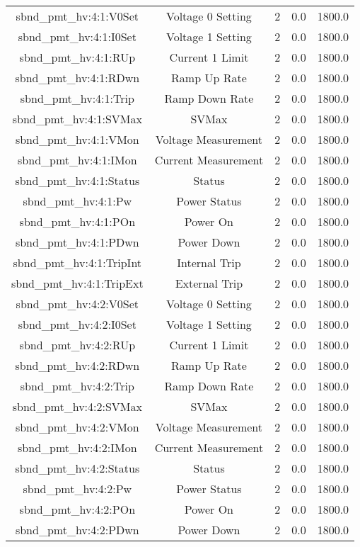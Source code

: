 \begin{center}
\begin{longtable}{c | c c c c }
sbnd\_pmt\_hv:4:1:V0Set & Voltage 0 Setting & 2 & 0.0 & 1800.0\\ 
sbnd\_pmt\_hv:4:1:I0Set & Voltage 1 Setting & 2 & 0.0 & 1800.0\\ 
sbnd\_pmt\_hv:4:1:RUp & Current 1 Limit & 2 & 0.0 & 1800.0\\ 
sbnd\_pmt\_hv:4:1:RDwn & Ramp Up Rate & 2 & 0.0 & 1800.0\\ 
sbnd\_pmt\_hv:4:1:Trip & Ramp Down Rate & 2 & 0.0 & 1800.0\\ 
sbnd\_pmt\_hv:4:1:SVMax & SVMax & 2 & 0.0 & 1800.0\\ 
sbnd\_pmt\_hv:4:1:VMon & Voltage Measurement & 2 & 0.0 & 1800.0\\ 
sbnd\_pmt\_hv:4:1:IMon & Current Measurement & 2 & 0.0 & 1800.0\\ 
sbnd\_pmt\_hv:4:1:Status & Status & 2 & 0.0 & 1800.0\\ 
sbnd\_pmt\_hv:4:1:Pw & Power Status & 2 & 0.0 & 1800.0\\ 
sbnd\_pmt\_hv:4:1:POn & Power On & 2 & 0.0 & 1800.0\\ 
sbnd\_pmt\_hv:4:1:PDwn & Power Down & 2 & 0.0 & 1800.0\\ 
sbnd\_pmt\_hv:4:1:TripInt & Internal Trip & 2 & 0.0 & 1800.0\\ 
sbnd\_pmt\_hv:4:1:TripExt & External Trip & 2 & 0.0 & 1800.0\\ 
sbnd\_pmt\_hv:4:2:V0Set & Voltage 0 Setting & 2 & 0.0 & 1800.0\\ 
sbnd\_pmt\_hv:4:2:I0Set & Voltage 1 Setting & 2 & 0.0 & 1800.0\\ 
sbnd\_pmt\_hv:4:2:RUp & Current 1 Limit & 2 & 0.0 & 1800.0\\ 
sbnd\_pmt\_hv:4:2:RDwn & Ramp Up Rate & 2 & 0.0 & 1800.0\\ 
sbnd\_pmt\_hv:4:2:Trip & Ramp Down Rate & 2 & 0.0 & 1800.0\\ 
sbnd\_pmt\_hv:4:2:SVMax & SVMax & 2 & 0.0 & 1800.0\\ 
sbnd\_pmt\_hv:4:2:VMon & Voltage Measurement & 2 & 0.0 & 1800.0\\ 
sbnd\_pmt\_hv:4:2:IMon & Current Measurement & 2 & 0.0 & 1800.0\\ 
sbnd\_pmt\_hv:4:2:Status & Status & 2 & 0.0 & 1800.0\\ 
sbnd\_pmt\_hv:4:2:Pw & Power Status & 2 & 0.0 & 1800.0\\ 
sbnd\_pmt\_hv:4:2:POn & Power On & 2 & 0.0 & 1800.0\\ 
sbnd\_pmt\_hv:4:2:PDwn & Power Down & 2 & 0.0 & 1800.0\\ 

\end{longtable}
\end{center}
